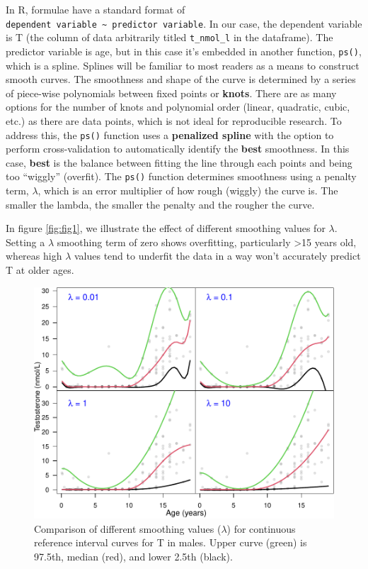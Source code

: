 \documentclass[]{elsarticle} %
\begin{document}
In R, formulae have a standard format of
\texttt{dependent\ variable\ \textasciitilde{}\ predictor\ variable}. In
our case, the dependent variable is T (the column of data arbitrarily
titled \texttt{t\_nmol\_l} in the dataframe). The predictor variable is
age, but in this case it's embedded in another function, \texttt{ps()},
which is a spline. Splines will be familiar to most readers as a means
to construct smooth curves. The smoothness and shape of the curve is
determined by a series of piece-wise polynomials between fixed points or
\textbf{knots}. There are as many options for the number of knots and
polynomial order (linear, quadratic, cubic, etc.) as there are data
points, which is not ideal for reproducible research. To address this,
the \texttt{ps()} function uses a \textbf{penalized spline} with the
option to perform cross-validation to automatically identify the
\textbf{best} smoothness. In this case, \textbf{best} is the balance
between fitting the line through each points and being too ``wiggly''
(overfit). The \texttt{ps()} function determines smoothness using a
penalty term, \(\lambda\), which is an error multiplier of how rough
(wiggly) the curve is. The smaller the lambda, the smaller the penalty
and the rougher the curve.

In figure \ref{fig:fig1}, we illustrate the effect of different
smoothing values for \(\lambda\). Setting a \(\lambda\) smoothing term
of zero shows overfitting, particularly \textgreater15 years old,
whereas high \(\lambda\) values tend to underfit the data in a way won't
accurately predict T at older ages.

\begin{figure}[H]
\includegraphics{smoothingfig1-1} \caption{\label{fig:fig1}Comparison of different smoothing values ($\lambda$) for continuous reference interval curves for T in males. Upper curve (green) is 97.5th, median (red), and lower 2.5th (black).}\label{fig:smoothingfig1}
\end{figure}
\end{document}
